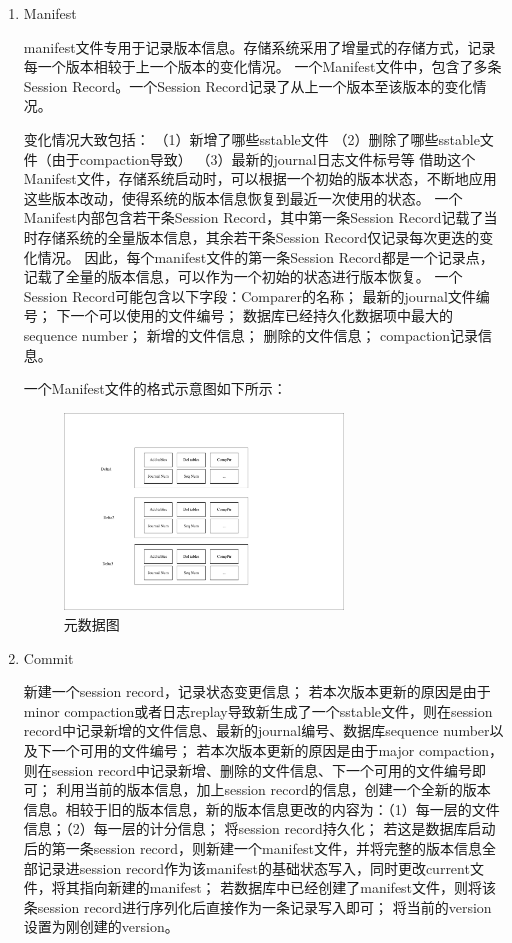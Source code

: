 		\begin{enumerate}
		
		\item Manifest

manifest文件专用于记录版本信息。存储系统采用了增量式的存储方式，记录每一个版本相较于上一个版本的变化情况。
一个Manifest文件中，包含了多条Session Record。一个Session Record记录了从上一个版本至该版本的变化情况。

变化情况大致包括：
（1）新增了哪些sstable文件
（2）删除了哪些sstable文件（由于compaction导致）
（3）最新的journal日志文件标号等
借助这个Manifest文件，存储系统启动时，可以根据一个初始的版本状态，不断地应用这些版本改动，使得系统的版本信息恢复到最近一次使用的状态。
一个Manifest内部包含若干条Session Record，其中第一条Session Record记载了当时存储系统的全量版本信息，其余若干条Session Record仅记录每次更迭的变化情况。
因此，每个manifest文件的第一条Session Record都是一个记录点，记载了全量的版本信息，可以作为一个初始的状态进行版本恢复。
一个Session Record可能包含以下字段：Comparer的名称；
最新的journal文件编号；
下一个可以使用的文件编号；
数据库已经持久化数据项中最大的sequence number；
新增的文件信息；
删除的文件信息；
compaction记录信息。


一个Manifest文件的格式示意图如下所示：
			
\begin{figure}[H]
	\centering
	\includegraphics[width=0.70\textwidth]{pdf/manifest.pdf}
	\caption{元数据图}
	\label{manifest}
\end{figure}

		\item Commit
		
新建一个session record，记录状态变更信息；
若本次版本更新的原因是由于minor compaction或者日志replay导致新生成了一个sstable文件，则在session record中记录新增的文件信息、最新的journal编号、数据库sequence number以及下一个可用的文件编号；
若本次版本更新的原因是由于major compaction，则在session record中记录新增、删除的文件信息、下一个可用的文件编号即可；
利用当前的版本信息，加上session record的信息，创建一个全新的版本信息。相较于旧的版本信息，新的版本信息更改的内容为：（1）每一层的文件信息；（2）每一层的计分信息；
将session record持久化；
若这是数据库启动后的第一条session record，则新建一个manifest文件，并将完整的版本信息全部记录进session record作为该manifest的基础状态写入，同时更改current文件，将其指向新建的manifest；
若数据库中已经创建了manifest文件，则将该条session record进行序列化后直接作为一条记录写入即可；
将当前的version设置为刚创建的version。


\end{enumerate}

